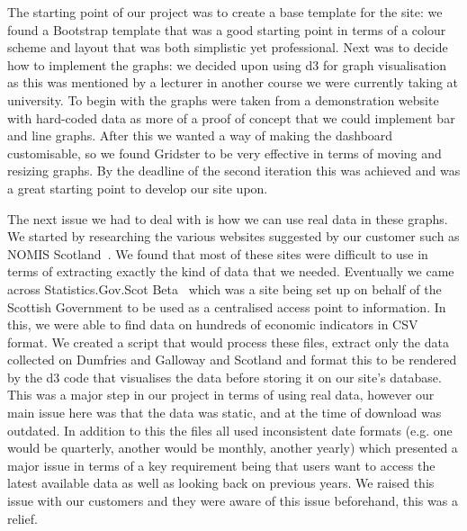 \documentclass{l3proj}
\begin{document}
The starting point of our project was to create a base template for the site: we found a Bootstrap template that was a good starting
point in terms of a colour scheme and layout that was both simplistic yet professional. Next was to decide how to implement the
graphs: we decided upon using d3 for graph visualisation as this was mentioned by a lecturer in another course we were currently
taking at university. To begin with the graphs were taken from a demonstration website with hard-coded data as more of a proof
of concept that we could implement bar and line graphs. After this we wanted a way of making the dashboard customisable, so we
found Gridster to be very effective in terms of moving and resizing graphs. By the deadline of the second iteration this was
achieved and was a great starting point to develop our site upon.

The next issue we had to deal with is how we can use real data in these graphs. We started by researching the various websites
suggested by our customer such as NOMIS Scotland~\cite{NOMISScot}. We found that most of these sites were difficult to use in terms of extracting
exactly the kind of data that we needed. Eventually we came across Statistics.Gov.Scot Beta~\cite{StatisticsScotBeta} which was a site being set up on behalf of
the Scottish Government to be used as a centralised access point to information. In this, we were able to find data on
hundreds of economic indicators in CSV format. We created a script that would process these files, extract only the data collected
on Dumfries and Galloway and Scotland and format this to be rendered by the d3 code that visualises the data before storing it on
our site's database. This was a major step in our project in terms of using real data, however our main issue here was that the
data was static, and at the time of download was outdated. In addition to this the files all used inconsistent date formats (e.g.
one would be quarterly, another would be monthly, another yearly) which presented a major issue in terms of a key requirement
being that users want to access the latest available data as well as looking back on previous years. We raised this issue
with our customers and they were aware of this issue beforehand, this was a relief.
\end{document}
